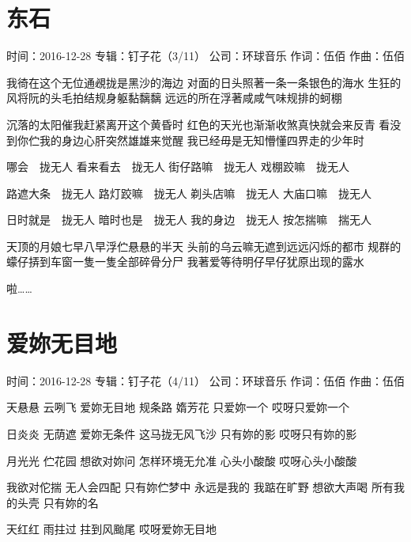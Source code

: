 \documentclass[UTF8,a4paper,oneside,twocolumn,12pt]{ctexbook}
\newcommand{\infopair}[2]{\textbullet #1：#2}
\newcommand{\zc}[1][伍佰]{\infopair{作词}{#1}}
\newcommand{\zq}[1][伍佰]{\infopair{作曲}{#1}}
\newcommand{\zj}[1]{\infopair{专辑}{#1}}
\newcommand{\sj}[1]{\infopair{时间}{#1}}
\newcommand{\gs}[1]{\infopair{公司}{#1}}
\newenvironment{info}{\begin{flushleft}\kaishu
	}
	{\end{flushleft}\normalsize\yahei\par}
\newenvironment{lyric}{
	}
{}
\begin{document}
\section{东石}
\begin{info}
	\sj{2016-12-28}
	\zj{钉子花（3/11）}
	\gs{环球音乐}
	\zc
	\zq
\end{info}
\begin{lyric}
	我徛在这个无位通覕拢是黑沙的海边
	对面的日头照著一条一条银色的海水
	生狂的风将阮的头毛拍结规身躯黏黐黐
	远远的所在浮著咸咸气味规排的蚵棚

	沉落的太阳催我赶紧离开这个黄昏时
	红色的天光也渐渐收煞真快就会来反青
	看没到你伫我的身边心肝突然雄雄来觉醒
	我已经毋是无知懵懂四界走的少年时

	哪会　拢无人
	看来看去　拢无人
	街仔路嘛　拢无人
	戏棚跤嘛　拢无人

	路遮大条　拢无人
	路灯跤嘛　拢无人
	剃头店嘛　拢无人
	大庙口嘛　拢无人

	日时就是　拢无人
	暗时也是　拢无人
	我的身边　拢无人
	按怎揣嘛　揣无人

	天顶的月娘七早八早浮伫悬悬的半天
	头前的乌云嘛无遮到远远闪烁的都市
	规群的蠓仔挵到车窗一隻一隻全部碎骨分尸
	我著爱等待明仔早仔犹原出现的露水

	啦……
\end{lyric}

\section{爱妳无目地}
\begin{info}
	\sj{2016-12-28}
	\zj{钉子花（4/11）}
	\gs{环球音乐}
	\zc
	\zq
\end{info}
\begin{lyric}
	天悬悬 云咧飞
	爱妳无目地
	规条路 媠芳花
	只爱妳一个 哎呀只爱妳一个

	日炎炎 无荫遮
	爱妳无条件
	这马拢无风飞沙
	只有妳的影 哎呀只有妳的影

	月光光 伫花园
	想欲对妳问
	怎样环境无允准
	心头小酸酸 哎呀心头小酸酸

	我欲对佗揣 无人会四配
	只有妳伫梦中 永远是我的
	我踮在旷野 想欲大声喝
	所有我的头壳 只有妳的名

	天红红 雨拄过
	拄到风颱尾 哎呀爱妳无目地
\end{lyric}
\end{document}
